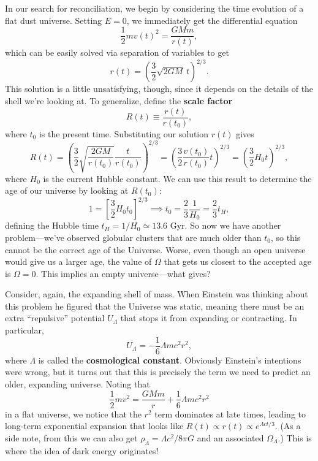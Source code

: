 \documentclass[../a062main.tex]{subfiles}
\begin{document}
In our search for reconciliation, we begin by considering the time evolution of a flat dust universe.
Setting $E = 0$, we immediately get the differential equation
\[ \frac{1}{2} mv(t)^2 = \frac{GMm}{r(t)}, \]
which can be easily solved via separation of variables to get
\[ r(t) = \left( \frac{3}{2} \sqrt{2GM} \,t \right)^{2 / 3}. \]
This solution is a little unsatisfying, though, since it depends on the details of the shell we're looking at.
To generalize, define the \textbf{scale factor}
\[ R(t) \equiv \frac{r(t)}{r(t_0)}, \]
where $t_0$ is the present time.
Substituting our solution $r(t)$ gives
\[ R(t) = \left( \frac{3}{2} \sqrt{\frac{2GM}{r(t_0)}} \frac{t}{r(t_0)} \right)^{2 / 3} = \left( \frac{3}{2} \frac{v(t_0)}{r(t_0)} t \right)^{2 / 3} = \left( \frac{3}{2} H_0 t \right)^{2 / 3}, \]
where $H_0$ is the current Hubble constant.
We can use this result to determine the age of our universe by looking at $R(t_0)$:
\[ 1 = \left[ \frac{3}{2} H_0 t_0 \right]^{2 / 3} \implies t_0 = \frac{2}{3} \frac{1}{H_0} = \frac{2}{3} t_H, \]
defining the Hubble time $t_H = 1 / H_0 \simeq 13.6 \textrm{ Gyr}$.
So now we have another problem---we've observed globular clusters that are much older than $t_0$, so this cannot be the correct age of the Universe.
Worse, even though an open universe would give us a larger age, the value of $\Omega$ that gets us closest to the accepted age is $\Omega = 0$.
This implies an empty universe---what gives?

Consider, again, the expanding shell of mass.
When Einstein was thinking about this problem he figured that the Universe was static, meaning there must be an extra ``repulsive''  potential $U_\Lambda$ that stops it from expanding or contracting.
In particular,
\[ U_\Lambda = -\frac{1}{6} \Lambda mc^2 r^2, \]
where $\Lambda$ is called the \textbf{cosmological constant}.
Obviously Einstein's intentions were wrong, but it turns out that this is precisely the term we need to predict an older, expanding universe.
Noting that
\[ \frac{1}{2} mv^2 = \frac{GMm}{r} + \frac{1}{6} \Lambda mc^2 r^2 \]
in a flat universe, we notice that the $r^2$ term dominates at late times, leading to long-term exponential expansion that looks like $R(t) \propto r(t) \propto e^{\Lambda ct / 3}$.
(As a side note, from this we can also get $\rho_\Lambda = \Lambda c^2 / 8\pi G$ and an associated $\Omega_\Lambda$.)
This is where the idea of dark energy originates!
\end{document}

